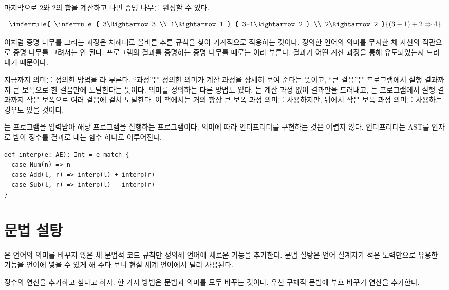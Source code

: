 마지막으로 $2$와 $2$의 합을 계산하고 나면 증명 나무를 완성할 수 있다.

\[
  \inferrule
  {
    \inferrule
    { 3\Rightarrow3 \\ 1\Rightarrow1 }
    { 3-1\Rightarrow2 }
    \\
    2\Rightarrow2
  }
  { (3-1)+2\Rightarrow4 }
\]

이처럼 증명 나무를 그리는 과정은 차례대로 올바른 추론 규칙을 찾아 기계적으로
적용하는 것이다. 정의한 언어의 의미를 무시한 채 자신의 직관으로 증명 나무를
그려서는 안 된다. 프로그램의 결과를 증명하는 증명 나무를 때로는 이라 부른다. 결과가 어떤 계산 과정을 통해 유도되었는지
드러내기 때문이다.

지금까지 의미를 정의한 방법을 라 부른다. ``과정''은 정의한 의미가 계산 과정을 상세히 보여 준다는
뜻이고, ``큰 걸음''은 프로그램에서 실행 결과까지 큰 보폭으로 한 걸음만에
도달한다는 뜻이다. 의미를 정의하는 다른 방법도 있다. 는 계산 과정 없이 결과만을 드러내고, 는 프로그램에서 실행 결과까지
작은 보폭으로 여러 걸음에 걸쳐 도달한다. 이 책에서는 거의 항상 큰 보폭 과정
의미를 사용하지만, 뒤에서 작은 보폭 과정 의미를 사용하는 경우도 있을 것이다.

는 프로그램을 입력받아 해당 프로그램을 실행하는
프로그램이다.  의미에 따라 인터프리터를 구현하는 것은 어렵지 않다.
인터프리터는 AST를 인자로 받아 정수를 결과로 내는 함수 하나로 이루어진다.

\begin{verbatim}
def interp(e: AE): Int = e match {
  case Num(n) => n
  case Add(l, r) => interp(l) + interp(r)
  case Sub(l, r) => interp(l) - interp(r)
}
\end{verbatim}

\section{문법 설탕}

은 언어의 의미를 바꾸지 않은 채 문법적 코드
 규칙만 정의해 언어에 새로운 기능을 추가한다. 문법
설탕은 언어 설계자가 적은 노력만으로 유용한 기능을 언어에 넣을 수 있게 해 주다
보니 현실 세계 언어에서 널리 사용된다.

정수의  연산을  추가하고 싶다고 하자. 한 가지
방법은 문법과 의미를 모두 바꾸는 것이다. 우선 구체적 문법에 부호 바꾸기 연산을
추가한다.

